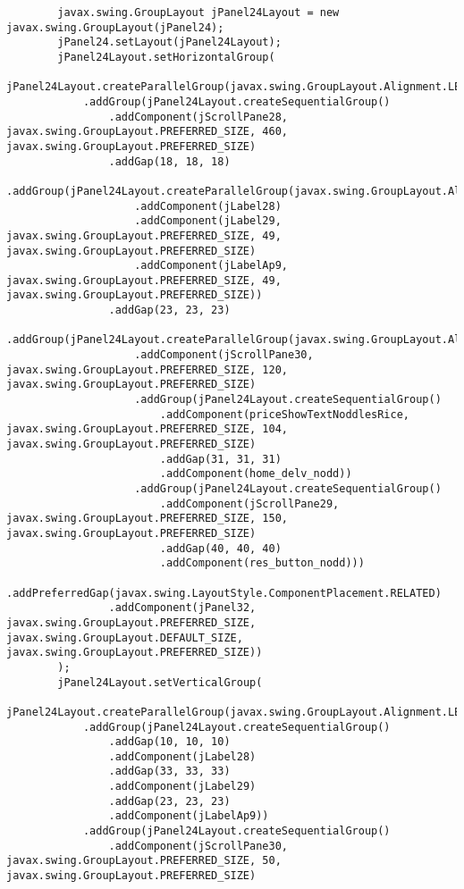 \documentclass[12pt,a4paper]{article}
\begin{document}
\begin{lstlisting}
        javax.swing.GroupLayout jPanel24Layout = new javax.swing.GroupLayout(jPanel24);
        jPanel24.setLayout(jPanel24Layout);
        jPanel24Layout.setHorizontalGroup(
            jPanel24Layout.createParallelGroup(javax.swing.GroupLayout.Alignment.LEADING)
            .addGroup(jPanel24Layout.createSequentialGroup()
                .addComponent(jScrollPane28, javax.swing.GroupLayout.PREFERRED_SIZE, 460, javax.swing.GroupLayout.PREFERRED_SIZE)
                .addGap(18, 18, 18)
                .addGroup(jPanel24Layout.createParallelGroup(javax.swing.GroupLayout.Alignment.LEADING)
                    .addComponent(jLabel28)
                    .addComponent(jLabel29, javax.swing.GroupLayout.PREFERRED_SIZE, 49, javax.swing.GroupLayout.PREFERRED_SIZE)
                    .addComponent(jLabelAp9, javax.swing.GroupLayout.PREFERRED_SIZE, 49, javax.swing.GroupLayout.PREFERRED_SIZE))
                .addGap(23, 23, 23)
                .addGroup(jPanel24Layout.createParallelGroup(javax.swing.GroupLayout.Alignment.LEADING)
                    .addComponent(jScrollPane30, javax.swing.GroupLayout.PREFERRED_SIZE, 120, javax.swing.GroupLayout.PREFERRED_SIZE)
                    .addGroup(jPanel24Layout.createSequentialGroup()
                        .addComponent(priceShowTextNoddlesRice, javax.swing.GroupLayout.PREFERRED_SIZE, 104, javax.swing.GroupLayout.PREFERRED_SIZE)
                        .addGap(31, 31, 31)
                        .addComponent(home_delv_nodd))
                    .addGroup(jPanel24Layout.createSequentialGroup()
                        .addComponent(jScrollPane29, javax.swing.GroupLayout.PREFERRED_SIZE, 150, javax.swing.GroupLayout.PREFERRED_SIZE)
                        .addGap(40, 40, 40)
                        .addComponent(res_button_nodd)))
                .addPreferredGap(javax.swing.LayoutStyle.ComponentPlacement.RELATED)
                .addComponent(jPanel32, javax.swing.GroupLayout.PREFERRED_SIZE, javax.swing.GroupLayout.DEFAULT_SIZE, javax.swing.GroupLayout.PREFERRED_SIZE))
        );
        jPanel24Layout.setVerticalGroup(
            jPanel24Layout.createParallelGroup(javax.swing.GroupLayout.Alignment.LEADING)
            .addGroup(jPanel24Layout.createSequentialGroup()
                .addGap(10, 10, 10)
                .addComponent(jLabel28)
                .addGap(33, 33, 33)
                .addComponent(jLabel29)
                .addGap(23, 23, 23)
                .addComponent(jLabelAp9))
            .addGroup(jPanel24Layout.createSequentialGroup()
                .addComponent(jScrollPane30, javax.swing.GroupLayout.PREFERRED_SIZE, 50, javax.swing.GroupLayout.PREFERRED_SIZE)

\end{lstlisting}
\end{document}
